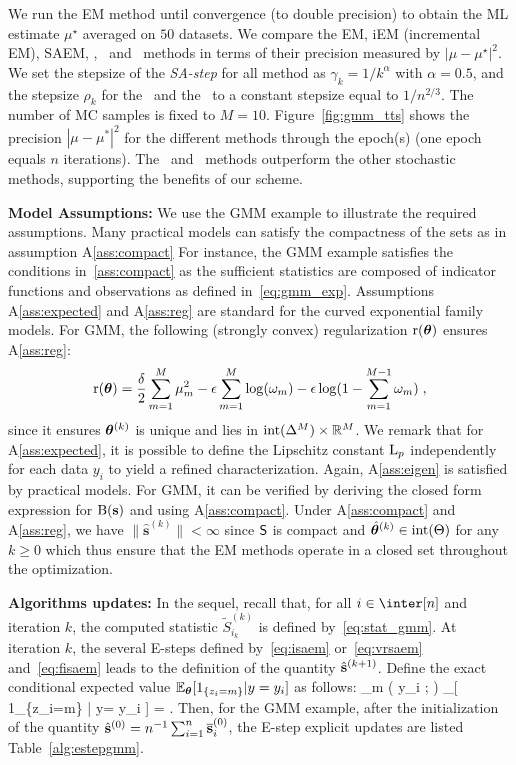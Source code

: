 \documentclass[12pt]{article}
\begin{document}
We run the EM method until convergence (to double precision) to obtain the ML estimate $\mu^\star$ averaged on $50$ datasets. 
We compare the EM, iEM (incremental EM), SAEM, \ISAEM, \SAEMVR\ and \FISAEM\ methods in terms of their precision measured by $| \mu - \mu^\star |^2$. 
We set the stepsize of the \textit{SA-step} for all method as $\gamma_k = 1/k^{\alpha}$ with $\alpha = 0.5$, and the stepsize $\rho_k$ for the \SAEMVR\ and the \FISAEM\ to a constant stepsize equal to $1/n^{2/3}$. 
The number of MC samples is fixed to $M=10$.
Figure~\ref{fig:gmm_tts} shows the precision $|\mu - \mu^*|^2$ for the different methods through the epoch(s) (one epoch equals $n$ iterations). 
The \SAEMVR\ and \FISAEM\ methods outperform the other stochastic methods, supporting the benefits of our scheme.

\medskip
\noindent \textbf{Model Assumptions:}
We use the GMM example to illustrate the required assumptions.
Many practical models can satisfy the compactness of the sets as in assumption A\ref{ass:compact}
For instance, the GMM example satisfies the conditions in~\ref{ass:compact} as the sufficient statistics are composed of indicator functions and observations as defined in~\eqref{eq:gmm_exp}.
Assumptions A\ref{ass:expected} and A\ref{ass:reg} are standard for the curved exponential family models.
For GMM, the following (strongly convex) regularization $\operatorname{r}( {\bm{\theta}} )$ ensures A\ref{ass:reg}:
$$
\operatorname{r}( {\bm{\theta}} ) = \frac{\delta}{2} \sum_{m=1}^M \mu_m^2 - \epsilon \sum_{m=1}^M  \log ( \omega_m )  - \epsilon \log ( 1 - \sum_{m=1}^{M-1} \omega_m ) \;,
$$
since it ensures ${\bm{\theta}}^{(k)}$ is unique and lies in ${\rm int}( \Delta^M ) \times \mathbb{R}^M$.
We remark that for A\ref{ass:expected}, it is possible to define the Lipschitz constant $\operatorname{L}_{p}$ independently for each data $y_i$ to yield a refined characterization. 
Again, A\ref{ass:eigen} is satisfied by practical models. For GMM, it can be verified by deriving the closed form expression for $\operatorname{B}( {\mathbf{s}} )$ and using A\ref{ass:compact}.
Under A\ref{ass:compact} and A\ref{ass:reg}, we have $\| \hat{\bm s}^{(k)} \| < \infty$ since $\mathsf{S}$ is compact and $\hat{{\bm{\theta}}}^{(k)} \in {\rm int}( \Theta )$ for any $k \geq 0$ which thus ensure that the EM methods operate in a closed set throughout the optimization.


\medskip
\noindent \textbf{Algorithms updates:}
In the sequel, recall that, for all $i \in \inter[n]$ and iteration $k$, the computed statistic $ \tilde{S}_{i_k}^{(k)}$ is defined by~\eqref{eq:stat_gmm}.
At iteration $k$, the several E-steps defined by~\eqref{eq:isaem} or~\eqref{eq:vrsaem} and~\eqref{eq:fisaem} leads to the definition of the quantity $\hat{{\mathbf{s}}}^{(k+1)} $. 
Define the exact conditional expected value $\mathbb{E}_{{\bm{\theta}}}[ 1_{\{z_i=m\}} | y= y_{i} ]$ as follows:
\beq \notag
\widetilde{\omega}_m ( y_{i} ; \param ) \eqdef \EE_{\param}[ 1_{\{z_i=m\}} | y= y_{i} ]
=  \eqsp.
\eeq
Then, for the GMM example, after the initialization of the quantity $\hat{{\mathbf{s}}}^{(0)} = n^{-1} \sum\nolimits_{i=1}^n \overline{{\mathbf{s}}}_i^{(0)} $, the E-step explicit updates are listed Table~\ref{alg:estepgmm}.
\end{document}
